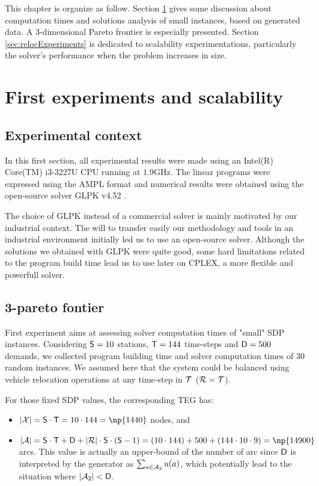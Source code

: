 \begin{bibunit}[ieeetr]
\bigskip
This chapter is organize as follow.
Section \ref{sec:firstExperiments} gives some discussion about computation times and solutions analysis of small instances, based on generated data.
A 3-dimensional Pareto frontier is especially presented.
Section \ref{sec:relocExperiments} is dedicated to scalability experimentations, particularly the solver's performance when the problem increases in size.

\section{First experiments and scalability} \label{sec:firstExperiments}
\subsection{Experimental context}
In this first section, all experimental results were made using an Intel(R) Core(TM) i3-3227U CPU running at $1.9$GHz. The linear programs were expressed using the AMPL format \cite{ampl_webPage} and numerical results were obtained using the open-source solver GLPK v4.52 \cite{glpk_webPage}.

\bigskip
The choice of GLPK instead of a commercial solver is mainly motivated by our industrial context.
The will to transfer easily our methodology and tools in an industrial environment initially led us to use an open-source solver.
Although the solutions we obtained with GLPK were quite good, some hard limitations related to the program build time lead us to use later on CPLEX, a more flexible and powerfull solver.

\subsection{3-pareto fontier}
First experiment aims at assessing solver computation times of "small" SDP instances.
Considering $\mathsf{S} = 10$ stations, $\mathsf{T} = 144$ time-steps and $\mathsf{D} = 500$ demands, we collected program building time and solver computation times of $30$ random instances.
We assumed here that the system could be balanced using vehicle relocation operations at any time-step in $\mathcal{T}$ (\ie $\mathcal{R} = \mathcal{T}$).

\bigskip
For those fixed SDP values, the corresponding TEG has:
\begin{itemize}
\item $|\tegNodeSet| = \nbStations \cdot \nbTimeSteps = 10 \cdot 144 = \np{1440}$ nodes, and
\item $|\tegArcSet| = \nbStations \cdot \nbTimeSteps + \nbDemands + |\relocTimeStepSet| \cdot \nbStations \cdot (\nbStations - 1) = (10 \cdot 144) + 500 + (144 \cdot 10 \cdot 9) = \np{14900}$ arcs. This value is actually an upper-bound of the number of arc since $\mathsf{D}$ is interpreted by the generator as $\sum_{a \in \mathcal{A}_2} u(a)$, which potentially lead to the situation where $|\mathcal{A}_2| < \mathsf{D}$.
\end{itemize}


\end{bibunit}
